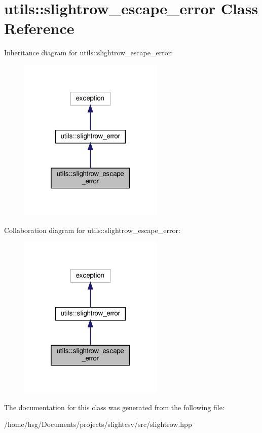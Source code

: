 \hypertarget{classutils_1_1slightrow__escape__error}{}\section{utils\+:\+:slightrow\+\_\+escape\+\_\+error Class Reference}
\label{classutils_1_1slightrow__escape__error}


Inheritance diagram for utils\+:\+:slightrow\+\_\+escape\+\_\+error\+:\nopagebreak
\begin{figure}[H]
\begin{center}
\leavevmode
\includegraphics[width=196pt]{classutils_1_1slightrow__escape__error__inherit__graph}
\end{center}
\end{figure}


Collaboration diagram for utils\+:\+:slightrow\+\_\+escape\+\_\+error\+:\nopagebreak
\begin{figure}[H]
\begin{center}
\leavevmode
\includegraphics[width=196pt]{classutils_1_1slightrow__escape__error__coll__graph}
\end{center}
\end{figure}


The documentation for this class was generated from the following file\+:\begin{DoxyCompactItemize}
\item 
/home/hsg/\+Documents/projects/slightcsv/src/slightrow.\+hpp\end{DoxyCompactItemize}
